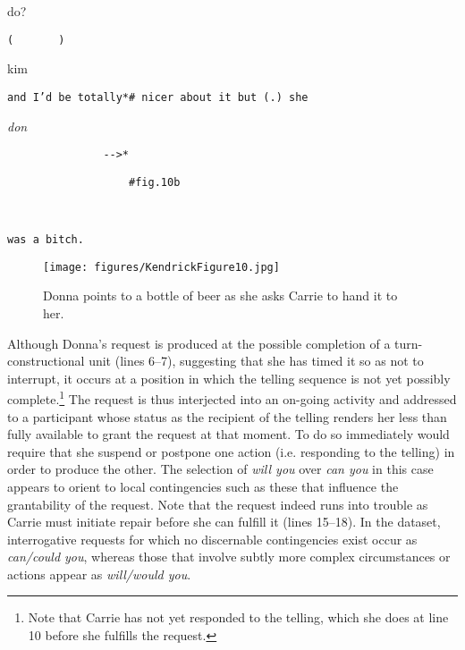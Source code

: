 \documentclass[output=paper,nonflat,modfont,draft]{langsci/langscibook}
\begin{document}
\begin{transbox}{22}{do?}
\begin{verbatim}
(       )
\end{verbatim}
\end{transbox}

\begin{transbox}{23}{kim}
\begin{verbatim}
and I’d be totally*# nicer about it but (.) she
\end{verbatim}
\end{transbox}

\begin{transbox}{24}{\textit{don}}
\begin{verbatim}
               -->*
\end{verbatim}
\end{transbox}

\begin{transbox}{25}{\fig}
\begin{verbatim}
                   #fig.10b
\end{verbatim}
\end{transbox}

\begin{transbox}{26}{~}
\begin{verbatim}
was a bitch.
\end{verbatim}
\end{transbox}\bigskip

\begin{figure}
\caption{Donna points to a bottle of beer as she asks Carrie to hand it to her.}
\texttt{[image: figures/KendrickFigure10.jpg]}
\end{figure}

Although Donna’s request is produced at the possible completion of a turn-constructional unit (lines 6--7), suggesting that she has timed it so as not to interrupt, it occurs at a position in which the telling sequence is not yet possibly complete.\footnote{Note that Carrie has not yet responded to the telling, which she does at line 10 before she fulfills the request.} The request is thus interjected into an on-going activity and addressed to a participant whose status as the recipient of the telling renders her less than fully available to grant the request at that moment. To do so immediately would require that she suspend or postpone one action (i.e. responding to the telling) in order to produce the other. The selection of \textit{will you} over \textit{can you} in this case appears to orient to local contingencies such as these that influence the grantability of the request. Note that the request indeed runs into trouble as Carrie must initiate repair before she can fulfill it (lines 15--18). In the dataset, interrogative requests for which no discernable contingencies exist occur as \textit{can/could you}, whereas those that involve subtly more complex circumstances or actions appear as \textit{will/would you}.
\end{document}
